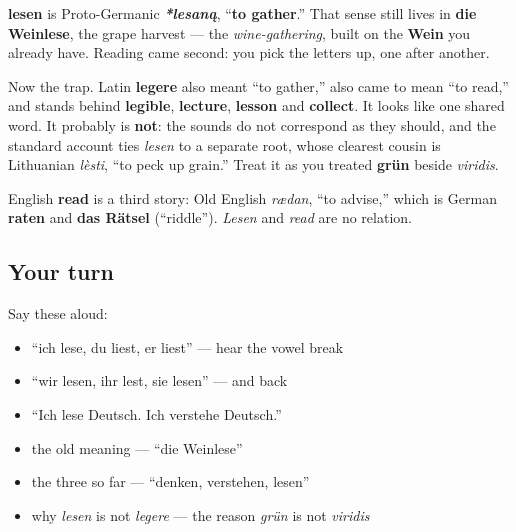 \begin{cousinweb}
\textbf{lesen} is Proto-Germanic \emph{\textbf{*lesaną}}, \textquotedblleft{}\textbf{to gather}.\textquotedblright{} That sense still lives in \textbf{die Weinlese}, the grape harvest — the \emph{wine-gathering}, built on the \textbf{Wein} you already have. Reading came second: you pick the letters up, one after another.

Now the trap. Latin \textbf{legere} also meant \textquotedblleft{}to gather,\textquotedblright{} also came to mean \textquotedblleft{}to read,\textquotedblright{} and stands behind \textbf{legible}, \textbf{lecture}, \textbf{lesson} and \textbf{collect}. It looks like one shared word. It probably is \textbf{not}: the sounds do not correspond as they should, and the standard account ties \emph{lesen} to a separate root, whose clearest cousin is Lithuanian \emph{lèsti}, \textquotedblleft{}to peck up grain.\textquotedblright{} Treat it as you treated \textbf{grün} beside \emph{viridis}.

English \textbf{read} is a third story: Old English \emph{rædan}, \textquotedblleft{}to advise,\textquotedblright{} which is German \textbf{raten} and \textbf{das Rätsel} (\textquotedblleft{}riddle\textquotedblright{}). \emph{Lesen} and \emph{read} are no relation.
\end{cousinweb}

\subsection*{Your turn}
Say these aloud:

\begin{itemize}
\raggedright
  \item \textquotedblleft{}ich lese, du liest, er liest\textquotedblright{} — hear the vowel break
  \item \textquotedblleft{}wir lesen, ihr lest, sie lesen\textquotedblright{} — and back
  \item \textquotedblleft{}Ich lese Deutsch. Ich verstehe Deutsch.\textquotedblright{}
  \item the old meaning — \textquotedblleft{}die Weinlese\textquotedblright{}
  \item the three so far — \textquotedblleft{}denken, verstehen, lesen\textquotedblright{}
  \item why \emph{lesen} is not \emph{legere} — the reason \emph{grün} is not \emph{viridis}
\end{itemize}


